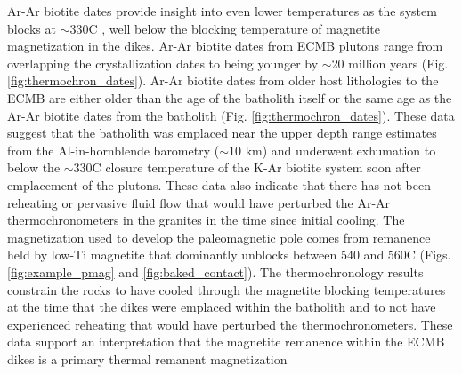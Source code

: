 \documentclass[draft]{agujournal2019}
\begin{document}
Ar-Ar biotite dates provide insight into even lower temperatures as the system blocks at $\sim$330\textdegree C \cite{Grove1996a}, well below the blocking temperature of magnetite magnetization in the dikes. Ar-Ar biotite dates from ECMB plutons range from overlapping the crystallization dates to being younger by $\sim$20 million years (Fig. \ref{fig:thermochron_dates}). Ar-Ar biotite dates from older host lithologies to the ECMB are either older than the age of the batholith itself or the same age as the Ar-Ar biotite dates from the batholith (Fig. \ref{fig:thermochron_dates}). These data suggest that the batholith was emplaced near the upper depth range estimates from the Al-in-hornblende barometry ($\sim$10 km) and underwent exhumation to below the $\sim$330\textdegree C closure temperature of the K-Ar biotite system soon after emplacement of the plutons. These data also indicate that there has not been reheating or pervasive fluid flow that would have perturbed the Ar-Ar thermochronometers in the granites in the time since initial cooling. The magnetization used to develop the paleomagnetic pole comes from remanence held by low-Ti magnetite that dominantly unblocks between 540 and 560\textdegree C (Figs. \ref{fig:example_pmag} and \ref{fig:baked_contact}). The thermochronology results constrain the rocks to have cooled through the magnetite blocking temperatures at the time that the dikes were emplaced within the batholith and to not have experienced reheating that would have perturbed the thermochronometers. These data support an interpretation that the magnetite remanence within the ECMB dikes is a primary thermal remanent magnetization 
\end{document}
